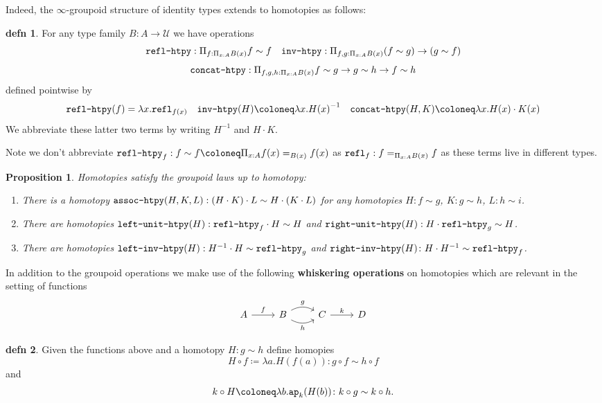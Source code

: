 \documentclass{amsart}
\theoremstyle{theorem}
\newtheorem*{prop}{Proposition}
\theoremstyle{definition}
\newtheorem*{defn}{defn}
\theoremstyle{remark}
\newcommand{\0}{\mathbbe{0}}
\newcommand{\1}{\mathbbe{1}}
\newcommand{\2}{\mathbbe{2}}
\newcommand{\3}{\mathbbe{3}}
\newcommand{\4}{\mathbbe{4}}
\newcommand{\term}[1]{{\textup{\texttt{#1}}}}
\newcommand{\refl}{\term{refl}}
\newcommand{\ap}{\term{ap}}
\newcommand{\UU}{{\mathcal{U}}}
\begin{document}
Indeed, the $\infty$-groupoid structure of identity types extends to homotopies as follows:

\begin{defn} For any type family $B \colon A \to \UU$ we have operations
\[ \term{refl-htpy} : \Pi_{f : \Pi_{x:A}B(x)} f \sim f \quad \term{inv-htpy} : \Pi_{f,g :\Pi_{x:A}B(x)} (f \sim g) \to (g \sim f) \]
\[ \term{concat-htpy} : \Pi_{f,g,h : \Pi_{x:A}B(x)} f \sim g \to g \sim h \to f \sim h\]
defined pointwise by
\[ \term{refl-htpy}(f) = \lambda x .\refl_{f(x)} \quad \term{inv-htpy}(H) \coloneq \lambda x. {H(x)}^{-1} \quad \term{concat-htpy}(H,K) \coloneq \lambda x. H(x) \cdot K(x)\]
We abbreviate these latter two terms by writing $H^{-1}$ and $H \cdot K$.
\end{defn}

Note we don't abbreviate $\term{refl-htpy}_f : f \sim f \coloneq \Pi_{x :A} f(x)=_{B(x)} f(x)$ as $\refl_f : f =_{\Pi_{x:A}B(x)}f$ as these terms live in different types.

\begin{prop} Homotopies satisfy the groupoid laws up to homotopy:
\begin{enumerate}
\item There is a homotopy $\term{assoc-htpy}(H,K,L) : (H \cdot K) \cdot L \sim H \cdot (K \cdot L)$ for any homotopies $H : f \sim g$, $K : g \sim h$, $L \colon h \sim i$.
\item There are homotopies $\term{left-unit-htpy}(H) : \term{refl-htpy}_f \cdot H \sim H$ and $\term{right-unit-htpy}(H) : H \cdot \term{refl-htpy}_g \sim H$.
\item There are homotopies $\term{left-inv-htpy}(H) : H^{-1} \cdot H \sim \term{refl-htpy}_g$ and $\term{right-inv-htpy}(H) \colon H \cdot H^{-1} \sim \term{refl-htpy}_f$.
\end{enumerate}
\end{prop}

In addition to the groupoid operations we make use of the following \textbf{whiskering operations} on homotopies which are relevant in the setting of functions
\[
\begin{tikzcd} A \arrow[r, "f"] & B \arrow[r, bend left, "g"] \arrow[r, bend right, "h"'] & C \arrow[r, "k"] & D
\end{tikzcd}
\]

\begin{defn} Given the functions above and a homotopy $H \colon g \sim h$ define homopies
\[ H \circ f \coloneq \lambda a. H(f(a)) \colon g \circ f \sim h \circ f\]
and
\[
k \circ H \coloneq \lambda b. \ap_k(H(b)) \colon k \circ g \sim k \circ h.\]
\end{defn}
\end{document}
